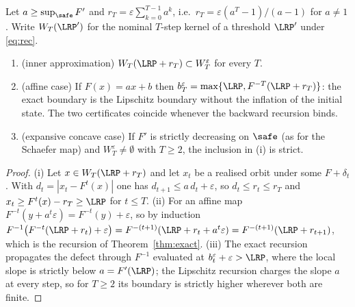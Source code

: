 \begin{proposition}\label{prop:lip}
Let $a\ge\sup_{\safe}F'$ and $r_T=\varepsilon\sum_{k=0}^{T-1}a^{k}$, i.e.\ $r_T=\varepsilon(a^{T}-1)/(a-1)$ for $a\neq1$. Write $W_T(\LRP')$ for the nominal $T$-step kernel of a threshold $\LRP'$ under \eqref{eq:rec}.
\begin{enumerate}[label=(\roman*)]
\item (inner approximation) $W_T(\LRP+r_T)\subset W^{\varepsilon}_T$ for every $T$.
\item (affine case) If $F(x)=ax+b$ then $b^{\varepsilon}_T=\max\{\LRP,F^{-T}(\LRP+r_T)\}$: the exact boundary is the Lipschitz boundary without the inflation of the initial state. The two certificates coincide whenever the backward recursion binds.
\item (expansive concave case) If $F'$ is strictly decreasing on $\safe$ (as for the Schaefer map) and $W^{\varepsilon}_T\neq\emptyset$ with $T\ge2$, the inclusion in (i) is strict.
\end{enumerate}
\end{proposition}
\begin{proof}
(i) Let $x\in W_T(\LRP+r_T)$ and let $x_t$ be a realised orbit under some $F+\delta_t$. With $d_t=|x_t-F^{t}(x)|$ one has $d_{t+1}\le a\,d_t+\varepsilon$, so $d_t\le r_t\le r_T$ and $x_t\ge F^{t}(x)-r_T\ge\LRP$ for $t\le T$. (ii) For an affine map $F^{-t}(y+a^{t}\varepsilon)=F^{-t}(y)+\varepsilon$, so by induction $F^{-1}\bigl(F^{-t}(\LRP+r_t)+\varepsilon\bigr)=F^{-(t+1)}(\LRP+r_t+a^{t}\varepsilon)=F^{-(t+1)}(\LRP+r_{t+1})$, which is the recursion of Theorem~\ref{thm:exact}. (iii) The exact recursion propagates the defect through $F^{-1}$ evaluated at $b^{\varepsilon}_t+\varepsilon>\LRP$, where the local slope is strictly below $a=F'(\LRP)$; the Lipschitz recursion charges the slope $a$ at every step, so for $T\ge2$ its boundary is strictly higher wherever both are finite.
\end{proof}

